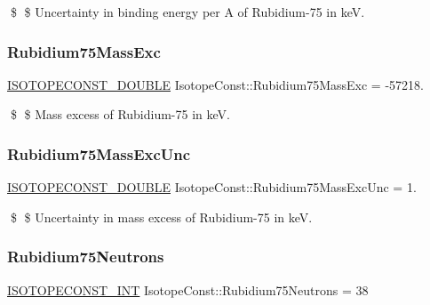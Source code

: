 \$ \$ Uncertainty in binding energy per A of Rubidium-\/75 in keV. \mbox{\label{group___isotope_const-_rubidium-_rb75_ga3a48d75e788ea73336c6857b3d08c4c7}} 
\subsubsection{\texorpdfstring{Rubidium75\+Mass\+Exc}{Rubidium75MassExc}}
{\footnotesize\ttfamily \mbox{\hyperlink{group___isotope_const-_macros_ga8f45a7272ce02c0b4c65c44636ed719a}{I\+S\+O\+T\+O\+P\+E\+C\+O\+N\+S\+T\+\_\+\+D\+O\+U\+B\+LE}} Isotope\+Const\+::\+Rubidium75\+Mass\+Exc = -\/57218.}

\$ \$ Mass excess of Rubidium-\/75 in keV. \mbox{\label{group___isotope_const-_rubidium-_rb75_gae0e3000becc84787559d2ead66a39438}} 
\subsubsection{\texorpdfstring{Rubidium75\+Mass\+Exc\+Unc}{Rubidium75MassExcUnc}}
{\footnotesize\ttfamily \mbox{\hyperlink{group___isotope_const-_macros_ga8f45a7272ce02c0b4c65c44636ed719a}{I\+S\+O\+T\+O\+P\+E\+C\+O\+N\+S\+T\+\_\+\+D\+O\+U\+B\+LE}} Isotope\+Const\+::\+Rubidium75\+Mass\+Exc\+Unc = 1.}

\$ \$ Uncertainty in mass excess of Rubidium-\/75 in keV. \mbox{\label{group___isotope_const-_rubidium-_rb75_gadfdcc36f3a8de2e24f0dafee0d5af590}} 
\subsubsection{\texorpdfstring{Rubidium75\+Neutrons}{Rubidium75Neutrons}}
{\footnotesize\ttfamily \mbox{\hyperlink{group___isotope_const-_macros_ga5f18360b3e99483a35c32d789e62621c}{I\+S\+O\+T\+O\+P\+E\+C\+O\+N\+S\+T\+\_\+\+I\+NT}} Isotope\+Const\+::\+Rubidium75\+Neutrons = 38}

